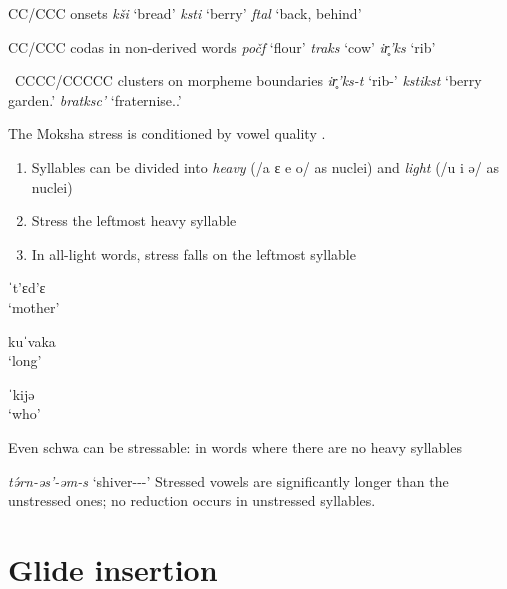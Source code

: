 \documentclass[a4paper, 12pt]{article}
\begin{document}
	\pex CC/CCC onsets
		\a \emph{kši} \hfill `bread'
		\a \emph{ksti} \hfill `berry'
		\a \emph{ftal} \hfill `back, behind'
	\xe
	
	\pex CC/CCC codas in non-derived words
		\a \emph{po\v{c}f} \hfill `flour'
		\a \emph{traks} \hfill `cow'
		\a \emph{ir̥'ks} \hfill `rib'
	\xe
	
	\pex~CCCC/CCCCC clusters on morpheme boundaries
		\a \emph{ir̥'ks-t} \hfill `rib-{\Pl}'
		\a \emph{kstikst} \hfill `berry garden.{\Pl}'
		\a \emph{bratksc'} \hfill `fraternise.{\Pst}.{\Tsg}'

	\xe
		
	The Moksha stress is conditioned by vowel quality \parencite{kukhto2018}. 
	
	\begin{enumerate}[$\gg$]
	\setlength\itemsep{0em}
		\item Syllables can be divided into \emph{heavy} (/a ɛ e o/ as nuclei) and \emph{light} (/u i ə/ as nuclei)
		\item Stress the leftmost heavy syllable
		\item In all-light words, stress falls on the leftmost syllable
	\end{enumerate}
		
		\vspace*{-1em}
\begin{minipage}[t]{.25\linewidth}
\ex\label{ex:tyadya}
	ˈt'ɛd'ɛ \\`mother'
\xe
\end{minipage}
\hfill
\begin{minipage}[t]{.25\linewidth}
\ex\label{ex:kuvakastress}
	kuˈvaka \\`long'
\xe
\end{minipage}	
\hfill
\begin{minipage}[t]{.4\linewidth}
\ex\label{ex:kijestress}
	ˈkijə \\`who'
\xe
\end{minipage}

	\noindent Even schwa can be stressable: in words where there are no heavy syllables
	
	\ex \emph{t{\'ə}rn-əs'-əm-s} \hfill `shiver-{\Freq}-{\Inf}-{\Ill}'
	\xe
	Stressed vowels are significantly longer than the unstressed ones; no reduction occurs in unstressed syllables.
		
		\section{Glide insertion}\label{sec:data}
		
\end{document}
